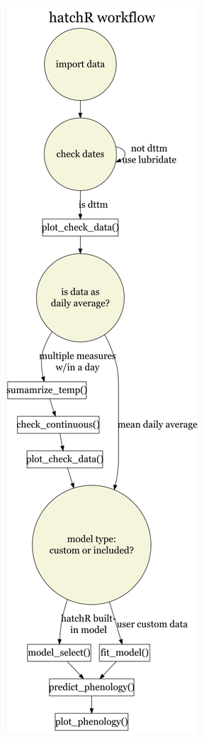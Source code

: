 \documentclass[webpdf,large,contemporary,namedate]{oup-authoring-template}
\theoremstyle{thmstyleone}
\theoremstyle{thmstyletwo}
\theoremstyle{thmstylethree}
\begin{document}
\begin{center}\includegraphics[width=1\linewidth,height=0.75\textheight]{flowchart} \end{center}
\end{document}
